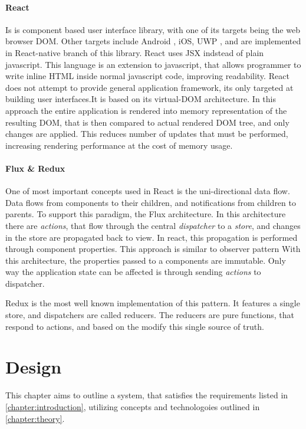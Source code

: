\subsubsection{React}
Is is component based user interface library, with one of its targets being the web browser DOM. Other targets
include Android , iOS, UWP , and are implemented in React-native branch of this library. React uses
JSX indstead of plain javascript. This language is an extension to javascript, that allows programmer to write inline
HTML inside normal javascript code, improving readability. React does not attempt to provide general application framework,
its only targeted at building user interfaces.It is based on its virtual-DOM architecture. In this approach
the entire application is rendered into memory representation of the resulting DOM, that is then compared to actual rendered
DOM tree, and only changes are applied. This reduces number of updates that must be performed, increasing rendering performance
at the cost of memory usage.

\subsubsection{Flux \& Redux}
One of most important concepts used in React is the uni-directional data flow. Data flows
from components to their children, and notifications from children to parents.
To support this paradigm, the Flux architecture. In this architecture there are \textit{actions}, that flow through the
central \textit{dispatcher} to a \textit{store}, and changes in the store are propagated back to view. In react,
this propagation is performed through component properties. This approach is similar to observer pattern
With this architecture, the properties passed to a components are immutable. Only way the application state can be affected is
through sending \textit{actions} to dispatcher.

Redux is the most well known implementation of this pattern. It features a single store, and dispatchers are
called reducers. The reducers are pure functions, that respond to actions, and based on the modify this single source of truth.

\chapter{Design}
\label{chapter:design}

This chapter aims to outline a system, that satisfies the requirements listed in \autoref{chapter:introduction}, utilizing
concepts and technologoies outlined in \autoref{chapter:theory}.


